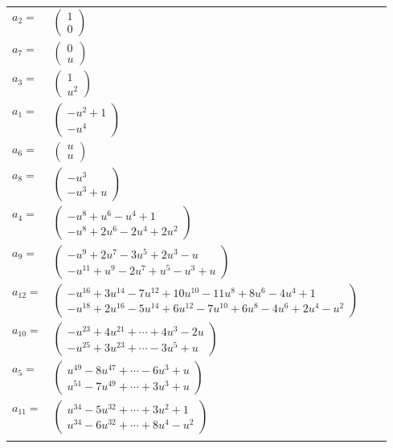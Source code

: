 \documentclass[1p]{elsarticle_modified}
\theoremstyle{definition}
\begin{document}
\begin{tabular}{m{7pt} m{180pt} m{7pt} m{180pt} }
\flushright $a_{2}=$&$\begin{pmatrix}1\\0\end{pmatrix}$ \\
\flushright $a_{7}=$&$\begin{pmatrix}0\\u\end{pmatrix}$ \\
\flushright $a_{3}=$&$\begin{pmatrix}1\\u^2\end{pmatrix}$ \\
\flushright $a_{1}=$&$\begin{pmatrix}- u^2+1\\- u^4\end{pmatrix}$ \\
\flushright $a_{6}=$&$\begin{pmatrix}u\\u\end{pmatrix}$ \\
\flushright $a_{8}=$&$\begin{pmatrix}- u^3\\- u^3+u\end{pmatrix}$ \\
\flushright $a_{4}=$&$\begin{pmatrix}- u^8+u^6- u^4+1\\- u^8+2 u^6-2 u^4+2 u^2\end{pmatrix}$ \\
\flushright $a_{9}=$&$\begin{pmatrix}- u^9+2 u^7-3 u^5+2 u^3- u\\- u^{11}+u^9-2 u^7+u^5- u^3+u\end{pmatrix}$ \\
\flushright $a_{12}=$&$\begin{pmatrix}- u^{16}+3 u^{14}-7 u^{12}+10 u^{10}-11 u^8+8 u^6-4 u^4+1\\- u^{18}+2 u^{16}-5 u^{14}+6 u^{12}-7 u^{10}+6 u^8-4 u^6+2 u^4- u^2\end{pmatrix}$ \\
\flushright $a_{10}=$&$\begin{pmatrix}- u^{23}+4 u^{21}+\cdots+4 u^3-2 u\\- u^{25}+3 u^{23}+\cdots-3 u^5+u\end{pmatrix}$ \\
\flushright $a_{5}=$&$\begin{pmatrix}u^{49}-8 u^{47}+\cdots-6 u^3+u\\u^{51}-7 u^{49}+\cdots+3 u^3+u\end{pmatrix}$ \\
\flushright $a_{11}=$&$\begin{pmatrix}u^{34}-5 u^{32}+\cdots+3 u^2+1\\u^{34}-6 u^{32}+\cdots+8 u^4- u^2\end{pmatrix}$\\&\end{tabular}
\end{document}
